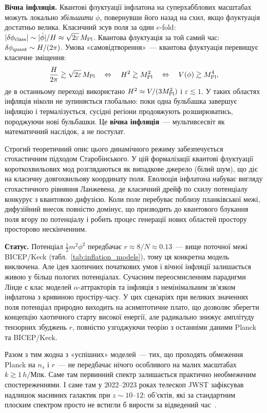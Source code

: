 \textbf{Вічна інфляція.} Квантові флуктуації інфлатона на
суперхабблових масштабах можуть локально \emph{збільшити} $\phi$,
повернувши його назад на схил, якщо флуктуація достатньо велика.
Класичний зсув поля за один $e$-fold: $|\delta\phi_{\rm class}|
\sim |\dot\phi|/H \approx \sqrt{2\varepsilon}\,M_{\rm Pl}$.
Квантова флуктуація за той самий час: $\delta\phi_{\rm quant}
\sim H/(2\pi)$. Умова «самовідтворення»~---
квантова флуктуація перевищує класичне зміщення:
\begin{equation*}
  \frac{H}{2\pi} \gtrsim \sqrt{2\varepsilon}\,M_{\rm Pl}
  \quad\Leftrightarrow\quad
  H^2 \gtrsim M_{\rm Pl}^2
  \quad\Leftrightarrow\quad
  V(\phi) \gtrsim M_{\rm Pl}^4,
\end{equation*}
де в останньому переході використано $H^2 \approx V/(3M_{\rm Pl}^2)$
і $\varepsilon \lesssim 1$.
У таких областях інфляція ніколи не зупиняється глобально:
поки одна бульбашка завершує інфляцію і термалізується,
сусідні регіони продовжують розширюватись, породжуючи нові
бульбашки. Це \textbf{вічна інфляція}~--- мультивсесвіт
як математичний наслідок, а не постулат.

Строгий теоретичний опис цього динамічного режиму забезпечується стохастичним
підходом Старобінського. У цій формалізації квантові флуктуації короткохвильових
мод розглядаються як випадкове джерело (білий шум), що діє на класичну
довгохвильову координату поля. Еволюція інфлатона набуває вигляду стохастичного
рівняння Ланжевена, де класичний дрейф по схилу потенціалу конкурує з квантовою
дифузією. Коли поле перебуває поблизу планківської межі, дифузійний внесок
повністю домінує, що призводить до квантового блукання поля вгору по потенціалу
і робить процес генерації нових областей простору просторово нескінченним.

\textbf{Статус.} Потенціал $\tfrac{1}{2}m^2\phi^2$ передбачає
$r \approx 8/N \approx 0.13$~--- вище поточної межі BICEP/Keck
(табл.~\ref{tab:inflation_models}), тому ця конкретна модель
виключена. Але ідея хаотичних початкових умов і вічної інфляції
залишається живою у більш пологих потенціалах. Сучасним переосмисленням
парадигми Лінде є клас моделей $\alpha$-аттракторів та інфляція з немінімальним
зв'язком інфлатона з кривиною простіру-часу. У цих сценаріях при великих
значеннях поля потенціал природно виходить на асимптотичне плато, що дозволяє
зберегти концепцію хаотичного старту високої енергії, але радикально знижує
амплітуду тензорних збуджень $r$, повністю узгоджуючи теорію з останніми даними
Planck та BICEP/Keck.

Разом з тим жодна з «успішних» моделей~--- тих, що проходять
обмеження Planck на $n_s$ і $r$~--- не передбачає нічого
особливого на малих масштабах $k \gtrsim 1\,h/$Мпк. Саме там
первинний спектр залишається практично необмеженим
спостереженнями. І саме там у 2022--2023 роках телескоп JWST
зафіксував надлишок масивних галактик при $z \sim 10$--$12$:
об'єктів, які за стандартним плоским спектром просто не встигли
б вирости за відведений час~\cite{finkelstein_2023,
boylan_kolchin_2023}.

